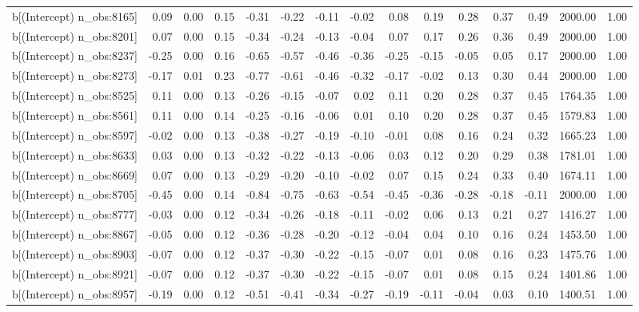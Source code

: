 \begin{table}[ht]
\begin{tabular}{rrrrrrrrrrrrrrr}
  b[(Intercept) n\_obs:8165] & 0.09 & 0.00 & 0.15 & -0.31 & -0.22 & -0.11 & -0.02 & 0.08 & 0.19 & 0.28 & 0.37 & 0.49 & 2000.00 & 1.00 \\ 
  b[(Intercept) n\_obs:8201] & 0.07 & 0.00 & 0.15 & -0.34 & -0.24 & -0.13 & -0.04 & 0.07 & 0.17 & 0.26 & 0.36 & 0.49 & 2000.00 & 1.00 \\ 
  b[(Intercept) n\_obs:8237] & -0.25 & 0.00 & 0.16 & -0.65 & -0.57 & -0.46 & -0.36 & -0.25 & -0.15 & -0.05 & 0.05 & 0.17 & 2000.00 & 1.00 \\ 
  b[(Intercept) n\_obs:8273] & -0.17 & 0.01 & 0.23 & -0.77 & -0.61 & -0.46 & -0.32 & -0.17 & -0.02 & 0.13 & 0.30 & 0.44 & 2000.00 & 1.00 \\ 
  b[(Intercept) n\_obs:8525] & 0.11 & 0.00 & 0.13 & -0.26 & -0.15 & -0.07 & 0.02 & 0.11 & 0.20 & 0.28 & 0.37 & 0.45 & 1764.35 & 1.00 \\ 
  b[(Intercept) n\_obs:8561] & 0.11 & 0.00 & 0.14 & -0.25 & -0.16 & -0.06 & 0.01 & 0.10 & 0.20 & 0.28 & 0.37 & 0.45 & 1579.83 & 1.00 \\ 
  b[(Intercept) n\_obs:8597] & -0.02 & 0.00 & 0.13 & -0.38 & -0.27 & -0.19 & -0.10 & -0.01 & 0.08 & 0.16 & 0.24 & 0.32 & 1665.23 & 1.00 \\ 
  b[(Intercept) n\_obs:8633] & 0.03 & 0.00 & 0.13 & -0.32 & -0.22 & -0.13 & -0.06 & 0.03 & 0.12 & 0.20 & 0.29 & 0.38 & 1781.01 & 1.00 \\ 
  b[(Intercept) n\_obs:8669] & 0.07 & 0.00 & 0.13 & -0.29 & -0.20 & -0.10 & -0.02 & 0.07 & 0.15 & 0.24 & 0.33 & 0.40 & 1674.11 & 1.00 \\ 
  b[(Intercept) n\_obs:8705] & -0.45 & 0.00 & 0.14 & -0.84 & -0.75 & -0.63 & -0.54 & -0.45 & -0.36 & -0.28 & -0.18 & -0.11 & 2000.00 & 1.00 \\ 
  b[(Intercept) n\_obs:8777] & -0.03 & 0.00 & 0.12 & -0.34 & -0.26 & -0.18 & -0.11 & -0.02 & 0.06 & 0.13 & 0.21 & 0.27 & 1416.27 & 1.00 \\ 
  b[(Intercept) n\_obs:8867] & -0.05 & 0.00 & 0.12 & -0.36 & -0.28 & -0.20 & -0.12 & -0.04 & 0.04 & 0.10 & 0.16 & 0.24 & 1453.50 & 1.00 \\ 
  b[(Intercept) n\_obs:8903] & -0.07 & 0.00 & 0.12 & -0.37 & -0.30 & -0.22 & -0.15 & -0.07 & 0.01 & 0.08 & 0.16 & 0.23 & 1475.76 & 1.00 \\ 
  b[(Intercept) n\_obs:8921] & -0.07 & 0.00 & 0.12 & -0.37 & -0.30 & -0.22 & -0.15 & -0.07 & 0.01 & 0.08 & 0.15 & 0.24 & 1401.86 & 1.00 \\ 
  b[(Intercept) n\_obs:8957] & -0.19 & 0.00 & 0.12 & -0.51 & -0.41 & -0.34 & -0.27 & -0.19 & -0.11 & -0.04 & 0.03 & 0.10 & 1400.51 & 1.00 \\ 

\end{tabular}
\end{table}
